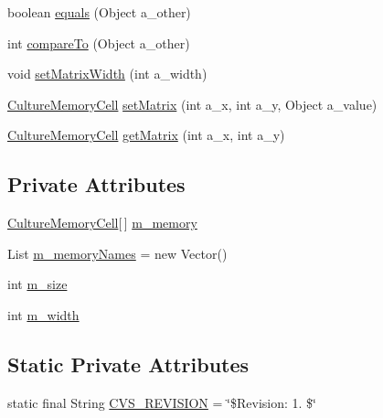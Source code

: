 \begin{DoxyCompactItemize}
\item 
boolean \hyperlink{classorg_1_1jgap_1_1distr_1_1_culture_a136e10203d46ea85d6d1de69d1a99b13}{equals} (Object a\-\_\-other)
\item 
int \hyperlink{classorg_1_1jgap_1_1distr_1_1_culture_a5b85e3558f66356cec2bb8b039e6f52b}{compare\-To} (Object a\-\_\-other)
\item 
void \hyperlink{classorg_1_1jgap_1_1distr_1_1_culture_a08a79305e11cc4a0ef70dbf3c810a5eb}{set\-Matrix\-Width} (int a\-\_\-width)
\item 
\hyperlink{classorg_1_1jgap_1_1distr_1_1_culture_memory_cell}{Culture\-Memory\-Cell} \hyperlink{classorg_1_1jgap_1_1distr_1_1_culture_a42274c8f0bbdfdb151fda3748c3750af}{set\-Matrix} (int a\-\_\-x, int a\-\_\-y, Object a\-\_\-value)
\item 
\hyperlink{classorg_1_1jgap_1_1distr_1_1_culture_memory_cell}{Culture\-Memory\-Cell} \hyperlink{classorg_1_1jgap_1_1distr_1_1_culture_a043230a9bd3049ce34d9d514b4f0fa9a}{get\-Matrix} (int a\-\_\-x, int a\-\_\-y)
\end{DoxyCompactItemize}
\subsection*{Private Attributes}
\begin{DoxyCompactItemize}
\item 
\hyperlink{classorg_1_1jgap_1_1distr_1_1_culture_memory_cell}{Culture\-Memory\-Cell}\mbox{[}$\,$\mbox{]} \hyperlink{classorg_1_1jgap_1_1distr_1_1_culture_a0d8b40a26aaf1b486f5943613473252d}{m\-\_\-memory}
\item 
List \hyperlink{classorg_1_1jgap_1_1distr_1_1_culture_a480cc144fcb71156b41d716498218adf}{m\-\_\-memory\-Names} = new Vector()
\item 
int \hyperlink{classorg_1_1jgap_1_1distr_1_1_culture_ad1ab8e7a6abcc106751ea5c1cf315f6c}{m\-\_\-size}
\item 
int \hyperlink{classorg_1_1jgap_1_1distr_1_1_culture_a1db817855b51fdbecdb7ee0f81150be5}{m\-\_\-width}
\end{DoxyCompactItemize}
\subsection*{Static Private Attributes}
\begin{DoxyCompactItemize}
\item 
static final String \hyperlink{classorg_1_1jgap_1_1distr_1_1_culture_a1b23418274685cea9eb358967e9f655a}{C\-V\-S\-\_\-\-R\-E\-V\-I\-S\-I\-O\-N} = \char`\"{}\$Revision\-: 1. \$\char`\"{}
\end{DoxyCompactItemize}


